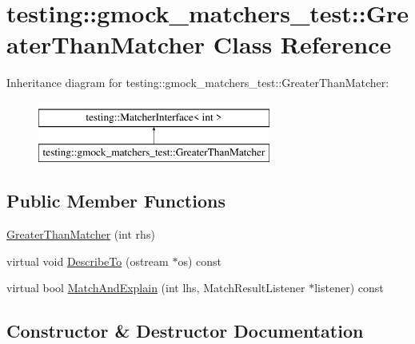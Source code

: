 \hypertarget{classtesting_1_1gmock__matchers__test_1_1GreaterThanMatcher}{}\section{testing\+::gmock\+\_\+matchers\+\_\+test\+::Greater\+Than\+Matcher Class Reference}
\label{classtesting_1_1gmock__matchers__test_1_1GreaterThanMatcher}
Inheritance diagram for testing\+::gmock\+\_\+matchers\+\_\+test\+::Greater\+Than\+Matcher\+:\begin{figure}[H]
\begin{center}
\leavevmode
\includegraphics[height=2.000000cm]{classtesting_1_1gmock__matchers__test_1_1GreaterThanMatcher}
\end{center}
\end{figure}
\subsection*{Public Member Functions}
\begin{DoxyCompactItemize}
\item 
\mbox{\hyperlink{classtesting_1_1gmock__matchers__test_1_1GreaterThanMatcher_a605c50137599a1dba0701bbd735bf1e8}{Greater\+Than\+Matcher}} (int rhs)
\item 
virtual void \mbox{\hyperlink{classtesting_1_1gmock__matchers__test_1_1GreaterThanMatcher_a49ea904382d0f5b80ccf622423ab0d94}{Describe\+To}} (ostream $\ast$os) const
\item 
virtual bool \mbox{\hyperlink{classtesting_1_1gmock__matchers__test_1_1GreaterThanMatcher_a85a583852003638507d872238bcf7c0f}{Match\+And\+Explain}} (int lhs, Match\+Result\+Listener $\ast$listener) const
\end{DoxyCompactItemize}


\subsection{Constructor \& Destructor Documentation}
\mbox{\label{classtesting_1_1gmock__matchers__test_1_1GreaterThanMatcher_a605c50137599a1dba0701bbd735bf1e8}} 
